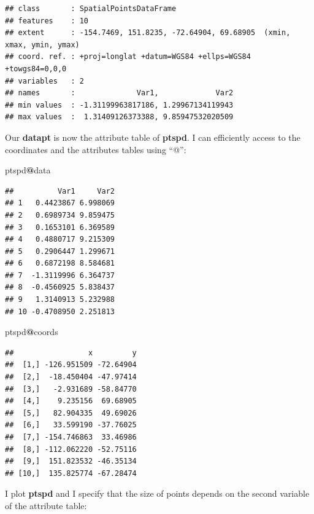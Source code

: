\documentclass[]{report}
\newenvironment{Shaded}{\begin{snugshade}}{\end{snugshade}}
\newcommand{\DataTypeTok}[1]{\textcolor[rgb]{0.13,0.29,0.53}{#1}}
\newcommand{\DecValTok}[1]{\textcolor[rgb]{0.00,0.00,0.81}{#1}}
\newcommand{\KeywordTok}[1]{\textcolor[rgb]{0.13,0.29,0.53}{\textbf{#1}}}
\newcommand{\NormalTok}[1]{#1}
\newcommand{\OperatorTok}[1]{\textcolor[rgb]{0.81,0.36,0.00}{\textbf{#1}}}
\begin{document}
\begin{verbatim}
## class       : SpatialPointsDataFrame 
## features    : 10 
## extent      : -154.7469, 151.8235, -72.64904, 69.68905  (xmin, xmax, ymin, ymax)
## coord. ref. : +proj=longlat +datum=WGS84 +ellps=WGS84 +towgs84=0,0,0 
## variables   : 2
## names       :              Var1,             Var2 
## min values  : -1.31199963817186, 1.29967134119943 
## max values  :  1.31409126373388, 9.85947532020509
\end{verbatim}

Our \textbf{datapt} is now the attribute table of \textbf{ptspd}. I can
efficiently access to the coordinates and the attributes tables using
``@'':

\begin{Shaded}
\begin{Highlighting}[]
\NormalTok{ptspd}\OperatorTok{@}\NormalTok{data}
\end{Highlighting}
\end{Shaded}

\begin{verbatim}
##          Var1     Var2
## 1   0.4423867 6.998069
## 2   0.6989734 9.859475
## 3   0.1653101 6.369589
## 4   0.4880717 9.215309
## 5   0.2906447 1.299671
## 6   0.6872198 8.584681
## 7  -1.3119996 6.364737
## 8  -0.4560925 5.838437
## 9   1.3140913 5.232988
## 10 -0.4708950 2.251813
\end{verbatim}

\begin{Shaded}
\begin{Highlighting}[]
\NormalTok{ptspd}\OperatorTok{@}\NormalTok{coords}
\end{Highlighting}
\end{Shaded}

\begin{verbatim}
##                 x         y
##  [1,] -126.951509 -72.64904
##  [2,]  -18.450404 -47.97414
##  [3,]   -2.931689 -58.84770
##  [4,]    9.235156  69.68905
##  [5,]   82.904335  49.69026
##  [6,]   33.599190 -37.76025
##  [7,] -154.746863  33.46986
##  [8,] -112.062220 -52.75116
##  [9,]  151.823532 -46.35134
## [10,]  135.825774 -67.28474
\end{verbatim}

I plot \textbf{ptspd} and I specify that the size of points depends on
the second variable of the attribute table:

\begin{Shaded}
\end{Shaded}
\end{document}
